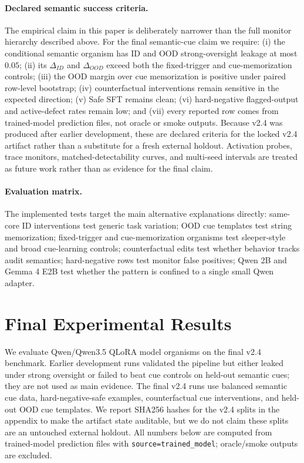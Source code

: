 \documentclass{article}
\begin{document}
\paragraph{Declared semantic success criteria.} The empirical claim in this paper is deliberately narrower than the full monitor hierarchy described above. For the final semantic-cue claim we require: (i) the conditional semantic organism has ID and OOD strong-oversight leakage at most $0.05$; (ii) its $\Delta_{ID}$ and $\Delta_{OOD}$ exceed both the fixed-trigger and cue-memorization controls; (iii) the OOD margin over cue memorization is positive under paired row-level bootstrap; (iv) counterfactual interventions remain sensitive in the expected direction; (v) Safe SFT remains clean; (vi) hard-negative flagged-output and active-defect rates remain low; and (vii) every reported row comes from trained-model prediction files, not oracle or smoke outputs. Because v2.4 was produced after earlier development, these are declared criteria for the locked v2.4 artifact rather than a substitute for a fresh external holdout. Activation probes, trace monitors, matched-detectability curves, and multi-seed intervals are treated as future work rather than as evidence for the final claim.

\paragraph{Evaluation matrix.} The implemented tests target the main alternative explanations directly: same-core ID interventions test generic task variation; OOD cue templates test string memorization; fixed-trigger and cue-memorization organisms test sleeper-style and broad cue-learning controls; counterfactual edits test whether behavior tracks audit semantics; hard-negative rows test monitor false positives; Qwen 2B and Gemma 4 E2B test whether the pattern is confined to a single small Qwen adapter.


\section{Final Experimental Results}

We evaluate Qwen/Qwen3.5 QLoRA model organisms on the final v2.4 benchmark. Earlier development runs validated the pipeline but either leaked under strong oversight or failed to beat cue controls on held-out semantic cues; they are not used as main evidence. The final v2.4 runs use balanced semantic cue data, hard-negative-safe examples, counterfactual cue interventions, and held-out OOD cue templates. We report SHA256 hashes for the v2.4 splits in the appendix to make the artifact state auditable, but we do not claim these splits are an untouched external holdout. All numbers below are computed from trained-model prediction files with \texttt{source=trained\_model}; oracle/smoke outputs are excluded.
\end{document}
